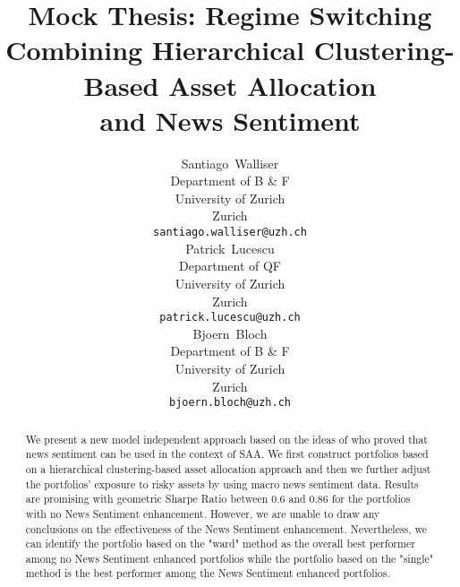 \documentclass[12pt]{article}
\title{Mock Thesis: Regime Switching \\ {\large Combining Hierarchical Clustering-Based Asset Allocation \\ and News Sentiment}}
\author{
  Santiago~Walliser\\
  Department of B \& F\\
  University of Zurich\\
  Zurich\\
  \texttt{santiago.walliser@uzh.ch} \\
   \And
  Patrick~Lucescu \\
  Department of QF\\
  University of Zurich\\
  Zurich \\
  \texttt{patrick.lucescu@uzh.ch} \\
   \And
  Bjoern~Bloch \\
  Department of B \& F\\
  University of Zurich\\
  Zurich \\
  \texttt{bjoern.bloch@uzh.ch} \\
}
\begin{document}
\maketitle

\begin{abstract}
We present a new model independent approach based on the ideas of \citeauthor{enhPortOpti} who proved that news sentiment can be used in the context of SAA. We first construct portfolios based on a hierarchical clustering-based asset allocation approach and then we further adjust the portfolios' exposure to risky assets by using macro news sentiment data. Results are promising with geometric Sharpe Ratio between 0.6 and 0.86 for the portfolios with no News Sentiment enhancement. However, we are unable to draw any conclusions on the effectiveness of the News Sentiment enhancement. Nevertheless, we can identify the portfolio based on the "ward" method as the overall best performer among no News Sentiment enhanced portfolios while the portfolio based on the "single" method is the best performer among the News Sentiment enhanced portfolios.
\end{abstract}







\newpage

\newpage




\newpage

\newpage

\newpage

\newpage

\newpage

\newpage
\printbibliography

\end{document}
